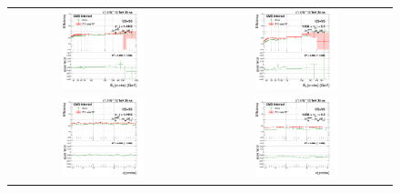 \begin{figure}[bh]
  \begin{center}
    \begin{tabular}{cc}
      \includegraphics[width=0.45\textwidth]{figures/Zprime/2017/ScaleFactor/SameSign/N-1/g_compare_cut_Et_Barrel_ea_ta_inc_AS_N_3_Trk_PUW.png} &
      \includegraphics[width=0.45\textwidth]{figures/Zprime/2017/ScaleFactor/SameSign/N-1/g_compare_cut_Et_Endcap_ea_ta_inc_AS_N_3_Trk_PUW.png} \\
      \includegraphics[width=0.45\textwidth]{figures/Zprime/2017/ScaleFactor/SameSign/N-1/g_compare_cut_phi_Barrel_ea_ta_inc_AS_N_3_Trk_PUW.png} &
      \includegraphics[width=0.45\textwidth]{figures/Zprime/2017/ScaleFactor/SameSign/N-1/g_compare_cut_phi_Endcap_ea_ta_inc_AS_N_3_Trk_PUW.png} \\

\end{tabular}
\end{center}
\end{figure}
